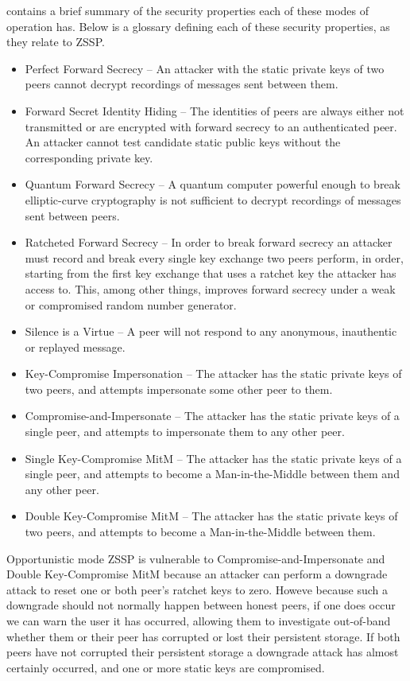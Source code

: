 \documentclass{article}
\begin{document}
 contains a brief summary of the security properties each of these modes of operation has. Below is a glossary defining each of these security properties, as they relate to ZSSP.

\begin{itemize}
	\item Perfect Forward Secrecy -- An attacker with the static private keys of two peers cannot decrypt recordings of messages sent between them.
	\item Forward Secret Identity Hiding -- The identities of peers are always either not transmitted or are encrypted with forward secrecy to an authenticated peer. An attacker cannot test candidate static public keys without the corresponding private key.
	\item Quantum Forward Secrecy -- A quantum computer powerful enough to break elliptic-curve cryptography is not sufficient to decrypt recordings of messages sent between peers.
	\item Ratcheted Forward Secrecy -- In order to break forward secrecy an attacker must record and break every single key exchange two peers perform, in order, starting from the first key exchange that uses a ratchet key the attacker has access to. This, among other things, improves forward secrecy under a weak or compromised random number generator.
	\item Silence is a Virtue -- A peer will not respond to any anonymous, inauthentic or replayed message.
	\item Key-Compromise Impersonation -- The attacker has the static private keys of two peers, and attempts impersonate some other peer to them.
	\item Compromise-and-Impersonate -- The attacker has the static private keys of a single peer, and attempts to impersonate them to any other peer.
	\item Single Key-Compromise MitM -- The attacker has the static private keys of a single peer, and attempts to become a Man-in-the-Middle between them and any other peer.
	\item Double Key-Compromise MitM -- The attacker has the static private keys of two peers, and attempts to become a Man-in-the-Middle between them.
\end{itemize}

Opportunistic mode ZSSP is vulnerable to Compromise-and-Impersonate and Double Key-Compromise MitM because an attacker can perform a downgrade attack to reset one or both peer's ratchet keys to zero. Howeve because such a downgrade should not normally happen between honest peers, if one does occur we can warn the user it has occurred, allowing them to investigate out-of-band whether them or their peer has corrupted or lost their persistent storage. If both peers have not corrupted their persistent storage a downgrade attack has almost certainly occurred, and one or more static keys are compromised.
\end{document}
